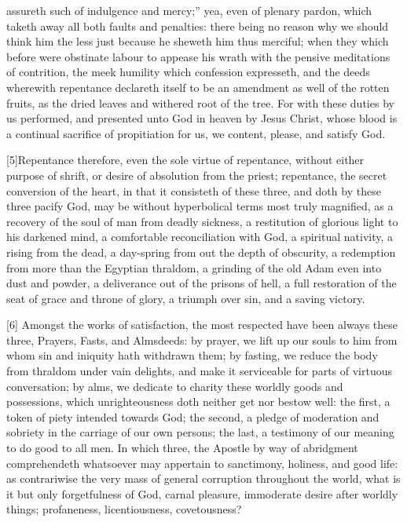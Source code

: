 assureth such of indulgence and mercy;” yea, even of plenary pardon, which taketh away all both faults and penalties: there being no reason why we should think him the less just because he sheweth him thus merciful; when they which before were obstinate labour to appease his wrath with the pensive meditations of contrition, the meek humility which confession expresseth, and the deeds wherewith repentance declareth itself to be an amendment as well of the rotten fruits, as the dried leaves and withered root of the tree. For with these duties by us performed, and presented unto God in heaven by Jesus Christ, whose blood is a continual sacrifice of propitiation for us, we content, please, and satisfy God.

[5]Repentance therefore, even the sole virtue of repentance, without either purpose of shrift, or desire of absolution from the priest; repentance, the secret conversion of the heart, in that it consisteth of these three, and doth by these three pacify God, may be without hyperbolical terms most truly magnified, as a recovery of the soul of man from deadly sickness, a restitution of glorious light to his darkened mind, a comfortable reconciliation with God, a spiritual nativity, a rising from the dead, a day-spring from out the depth of obscurity, a redemption from more than the Egyptian thraldom, a grinding of the old Adam even into dust and powder, a deliverance out of the prisons of hell, a full restoration of the seat of grace and throne of glory, a triumph over sin, and a saving victory.

[6] Amongst the works of satisfaction, the most respected have been always these three, Prayers, Fasts, and Almsdeeds: by prayer, we lift up our souls to him from whom sin and iniquity hath withdrawn them; by fasting, we reduce the body from thraldom under vain delights, and make it serviceable for parts of virtuous conversation; by alms,  we dedicate to charity these worldly goods and possessions, which unrighteousness doth neither get nor bestow well: the first, a token of piety intended towards God; the second, a pledge of moderation and sobriety in the carriage of our own persons; the last, a testimony of our meaning to do good to all men. In which three, the Apostle by way of abridgment comprehendeth whatsoever may appertain to sanctimony, holiness, and good life: as contrariwise the very mass of general corruption throughout the world, what is it but only forgetfulness of God, carnal pleasure, immoderate desire after worldly things; profaneness, licentiousness, covetousness?

